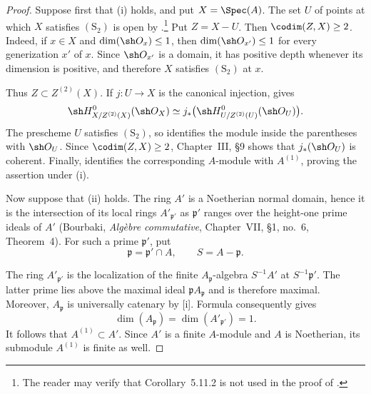 \begin{proof}
Suppose first that {\rm(i)} holds, and put $X=\Spec(A)$.  The set
$U$ of points at which $X$ satisfies $(\mathrm S_2)$ is open by
.\footnote{The reader may verify that
Corollary~5.11.2 is not used in the proof of
.}
Put $Z=X-U$.  Then $\codim(Z,X)\geq2$.  Indeed, if
$x\in X$ and $\dim(\sh O_x)\leq1$, then
$\dim(\sh O_{x'})\leq1$ for every generization $x'$ of $x$.
Since $\sh O_{x'}$ is a domain, it has positive depth whenever
its dimension is positive, and therefore $X$ satisfies
$(\mathrm S_2)$ at $x$.

Thus $Z\subset Z^{(2)}(X)$.  If $j:U\to X$ is the canonical
injection,  gives
\[
  \sh H^0_{X/Z^{(2)}(X)}(\sh O_X)
  \simeq
  j_*\bigl(
    \sh H^0_{U/Z^{(2)}(U)}(\sh O_U)
  \bigr).
\]
The prescheme $U$ satisfies $(\mathrm S_2)$, so
 identifies the module inside the parentheses
with $\sh O_U$.  Since $\codim(Z,X)\geq2$, Chapter~III,
\S9 shows that $j_*(\sh O_U)$ is coherent.  Finally,
 identifies the corresponding $A$-module with
$A^{(1)}$, proving the assertion under {\rm(i)}.

Now suppose that {\rm(ii)} holds.  The ring $A'$ is a Noetherian
normal domain, hence it is the intersection of its local rings
$A'_{\mathfrak p'}$ as $\mathfrak p'$ ranges over the
height-one prime ideals of $A'$
(Bourbaki, \emph{Alg\`ebre commutative}, Chapter~VII,
\S1, no.~6, Theorem~4).  For such a prime $\mathfrak p'$, put
\[
  \mathfrak p=\mathfrak p'\cap A,
  \qquad
  S=A-\mathfrak p.
\]


The ring $A'_{\mathfrak p'}$ is the localization of the finite
$A_{\mathfrak p}$-algebra $S^{-1}A'$ at
$S^{-1}\mathfrak p'$.  The latter prime lies above the maximal
ideal $\mathfrak pA_{\mathfrak p}$ and is therefore maximal.
Moreover, $A_{\mathfrak p}$ is universally catenary by
[i].  Formula  consequently gives
\[
  \dim(A_{\mathfrak p})
  =\dim(A'_{\mathfrak p'})
  =1.
\]
It follows that $A^{(1)}\subset A'$.  Since $A'$ is a finite
$A$-module and $A$ is Noetherian, its submodule $A^{(1)}$ is
finite as well.
\end{proof}
